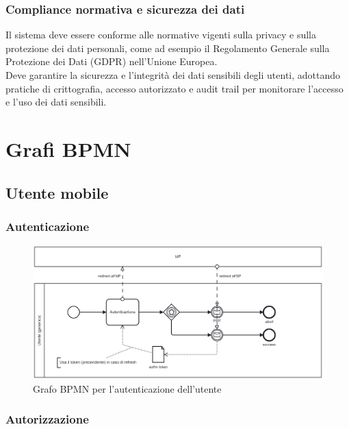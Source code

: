 \documentclass{article}
\begin{document}
\subsubsection{Compliance normativa e sicurezza dei dati}
Il sistema deve essere conforme alle normative vigenti sulla privacy e sulla protezione dei dati personali, come ad esempio il Regolamento Generale sulla Protezione dei Dati (GDPR) nell'Unione Europea.\\
Deve garantire la sicurezza e l'integrità dei dati sensibili degli utenti, adottando pratiche di crittografia, accesso autorizzato e audit trail per monitorare l'accesso e l'uso dei dati sensibili.

\clearpage

\section{Grafi BPMN}

\subsection{Utente mobile}

\subsubsection{Autenticazione}

\begin{figure}[htbp]
    \label{7.1.1}
    \centering
    \includegraphics[width=1\textwidth]{Images/BPMN - authn.png}
    \caption{Grafo BPMN per l'autenticazione dell'utente}
\end{figure}

\clearpage

\subsubsection{Autorizzazione}
\end{document}
